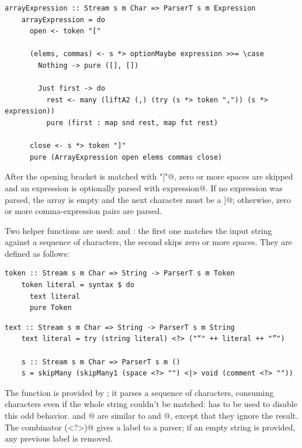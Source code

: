 \documentclass[UdineBachThesis,american,11pt]{PhdThesis}
\begin{document}
  \begin{lstlisting}[gobble=4,basicstyle=\ttfamily\small]
    arrayExpression :: Stream s m Char => ParserT s m Expression
    arrayExpression = do
      open <- token "["

      (elems, commas) <- s *> optionMaybe expression >>= \case
        Nothing -> pure ([], [])

        Just first -> do
          rest <- many (liftA2 (,) (try (s *> token ",")) (s *> expression))
          pure (first : map snd rest, map fst rest)

      close <- s *> token "]"
      pure (ArrayExpression open elems commas close)
  \end{lstlisting}

  After the opening bracket is matched with \lstinline@token "["@, zero or more
  spaces are skipped and an expression is optionally parsed with
  \lstinline@optionMaybe expression@. If no expression was parsed, the array is
  empty and the next character must be a \lstinline@]@; otherwise, zero or more
  comma-expression pairs are parsed.

  Two helper functions are used: \lstinline@token@ and \lstinline@s@: the first
  one matches the input string against a sequence of characters, the second
  skips zero or more spaces. They are defined as follows:

  \begin{lstlisting}[gobble=4,basicstyle=\ttfamily\small]
    token :: Stream s m Char => String -> ParserT s m Token
    token literal = syntax $ do
      text literal
      pure Token
  \end{lstlisting}

  \pagebreak

  \begin{lstlisting}[gobble=4,basicstyle=\ttfamily\small]
    text :: Stream s m Char => String -> ParserT s m String
    text literal = try (string literal) <?> ("“" ++ literal ++ "”")

    s :: Stream s m Char => ParserT s m ()
    s = skipMany (skipMany1 (space <?> "") <|> void (comment <?> ""))
  \end{lstlisting}

  The function \lstinline@string@ is provided by \lstinline@parsec@; it parses a
  sequence of characters, consuming characters even if the whole string couldn't
  be matched: \lstinline@try@ has to be used to disable this odd behavior.
  \lstinline@skipMany@ and @ are similar to \lstinline@many@
  and @, except that they ignore the result. The combinator
  \lstinline@(<?>)@ gives a label to a parser; if an empty string is provided,
  any previous label is removed.
\end{document}
